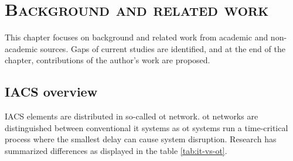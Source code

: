 \chapter{\textsc{Background and related work}} 

This chapter focuses on background and related work from academic and non-academic sources. Gaps of current studies are identified, and at the end of the chapter, contributions of the author's work are proposed.

\section{IACS overview}


IACS elements are distributed in so-called \gls*{ot} network. \gls*{ot} networks are distinguished between conventional \gls*{it} systems as \gls*{ot} systems run a time-critical process where the smallest delay can cause system disruption. Research \parencite{77-ics-kill-chain} has summarized differences as displayed in the table \ref{tab:it-vs-ot}.

